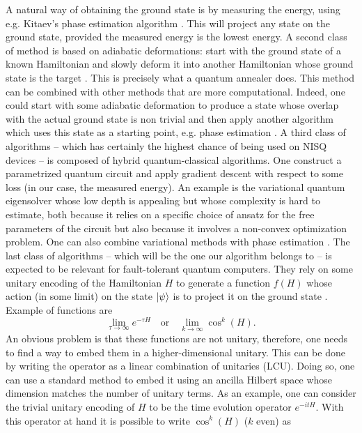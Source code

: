\documentclass[a4paper,11pt]{article}
\begin{document}
A natural way of obtaining the ground state is by measuring the energy, using e.g. Kitaev's phase estimation algorithm \cite{Kitaev1995QuantumMA}. This will project any state on the ground state, provided the measured energy is the lowest energy.  A second class of method is based on adiabatic deformations: start with the ground state of a known Hamiltonian and slowly deform it into another Hamiltonian whose ground state is the target \cite{Jansen_2007}. This is precisely what a quantum annealer does. This method can be combined with other methods that are more computational. Indeed, one could start with some adiabatic deformation to produce a state whose overlap with the actual ground state is non trivial and then apply another algorithm which uses this state as a starting point, e.g. phase estimation \cite{PhysRevA.77.012326}. A third class of algorithms -- which has certainly the highest chance of being used on NISQ devices -- is composed of hybrid quantum-classical algorithms. One construct a parametrized quantum circuit and apply gradient descent with respect to some loss (in our case, the measured energy). An example is the variational quantum eigensolver \cite{osti_1623945} whose low depth is appealing but whose complexity is hard to estimate, both because it relies on a specific choice of ansatz for the free parameters of the circuit but also because it involves a non-convex optimization problem. One can also combine variational methods with phase estimation \cite{Parrish2019QuantumFD}. The last class of algorithms -- which will be the one our algorithm belongs to -- is expected to be relevant for fault-tolerant quantum computers. They rely on some unitary encoding of the Hamiltonian $H$ to generate a function $f(H)$ whose action (in some limit) on the state $\ket{\psi}$ is to project it on the ground state \cite{ge2018faster, Motta_2019, Lin_2020}. Example of functions are 
\begin{equation}
    \lim_{\tau\to\infty}e^{-\tau H} \quad \mathrm{or} \quad \lim_{k\to\infty}\cos^k(H).
    \label{operators}
\end{equation}
An obvious problem is that these functions are not unitary, therefore, one needs to find a way to embed them in a higher-dimensional unitary. This can be done by writing the operator as a linear combination of unitaries (LCU). Doing so, one can use a standard method \cite{Berry2015HamiltonianSW, doi:10.1137/16M1087072} to embed it using an ancilla Hilbert space whose dimension matches the number of unitary terms. As an example, one can consider the trivial unitary encoding of $H$ to be the time evolution operator $e^{-itH}$. With this operator at hand it is possible to write $\cos^k(H)$ ($k$ even) as
\end{document}
